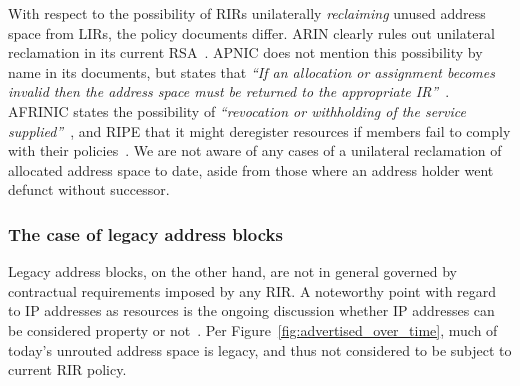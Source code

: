 \documentclass[letter]{sigcomm-alternate}
\begin{document}
With respect to the possibility of RIRs unilaterally \textit{reclaiming} unused 
address space from LIRs, the policy documents differ. ARIN clearly rules out 
unilateral reclamation in its current RSA~\cite{arin_rsa}.
APNIC does not mention this possibility by name in its documents, but states
that \textit{``If an allocation or assignment becomes invalid then the address
space must be returned to the appropriate IR''}~\cite{apnic_property}. AFRINIC
states the possibility of \textit{``revocation or withholding of the service
supplied''}~\cite{afrinic_property}, and RIPE that it might deregister resources
if members fail to comply with their policies~\cite{ripe_property}.  We are not
aware of any cases of a unilateral reclamation of allocated address space to
date, aside from those where an address holder went defunct without successor.


\subsubsection{The case of legacy address blocks}


Legacy address blocks, on the other hand, are not in general governed by
contractual requirements imposed by any RIR. A noteworthy point with regard to
IP addresses as resources is the ongoing discussion whether IP addresses can be
considered property or not~\cite{rubi2011ipv4}.  Per
Figure~\ref{fig:advertised_over_time}, much of today's unrouted address space
is legacy, and thus not considered to be subject to current RIR policy.
\end{document}
